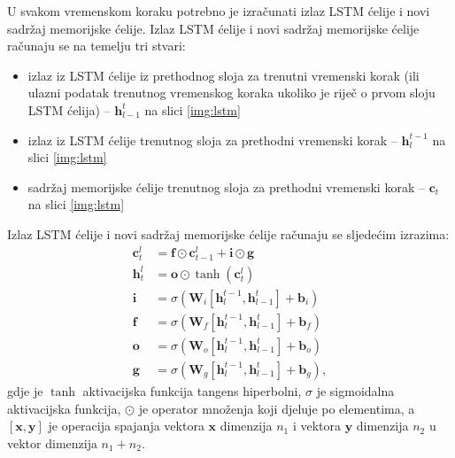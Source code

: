 \documentclass[times, utf8, diplomski, numeric]{fer}
\begin{document}
U svakom vremenskom koraku potrebno je izračunati izlaz LSTM ćelije i novi sadržaj memorijske ćelije.
Izlaz LSTM ćelije i novi sadržaj memorijske ćelije računaju se na temelju tri stvari:
\begin{itemize}
 \item izlaz iz LSTM ćelije iz prethodnog sloja za trenutni vremenski korak (ili ulazni podatak trenutnog vremenskog koraka ukoliko je riječ o prvom sloju LSTM ćelija) -- $\mathbf{h}_{l-1}^t$ na slici \ref{img:lstm}
 \item izlaz iz LSTM ćelije trenutnog sloja za prethodni vremenski korak  -- $\mathbf{h}_{l}^{t-1}$ na slici \ref{img:lstm}
 \item sadržaj memorijske ćelije trenutnog sloja za prethodni vremenski korak -- $\mathbf{c}_t$ na slici \ref{img:lstm}
\end{itemize}
Izlaz LSTM ćelije i novi sadržaj memorijske ćelije računaju se sljedećim izrazima:
\begin{align}
 \mathbf{c}_t^l &= \mathbf{f} \odot \mathbf{c}_{t-1}^l + \mathbf{i} \odot \mathbf{g} \\
 \mathbf{h}_t^l &= \mathbf{o} \odot \tanh(\mathbf{c}^l_t) \\
 \mathbf{i} &= \sigma (\mathbf{W}_i [\mathbf{h}_{l}^{t-1}, \mathbf{h}_{l-1}^t] + \mathbf{b}_i) \\
 \mathbf{f} &= \sigma (\mathbf{W}_f [\mathbf{h}_{l}^{t-1}, \mathbf{h}_{l-1}^t] + \mathbf{b}_f) \\
 \mathbf{o} &= \sigma (\mathbf{W}_o [\mathbf{h}_{l}^{t-1}, \mathbf{h}_{l-1}^t] + \mathbf{b}_o) \\
 \mathbf{g} &= \sigma (\mathbf{W}_g [\mathbf{h}_{l}^{t-1}, \mathbf{h}_{l-1}^t] + \mathbf{b}_g), 
\end{align}
gdje je $\tanh$ aktivacijska funkcija tangens hiperbolni, $\sigma$ je sigmoidalna aktivacijska funkcija, $\odot$ je operator množenja koji djeluje po elementima, a $[\mathbf{x}, \mathbf{y}]$ je operacija spajanja vektora $\mathbf{x}$ dimenzija $n_1$ i vektora $\mathbf{y}$ dimenzija $n_2$ u vektor dimenzija $n_1 + n_2$.
\end{document}
